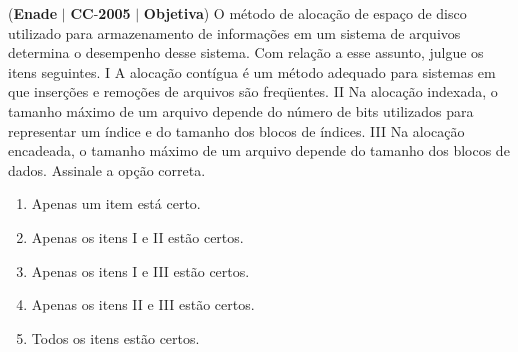 \documentclass{exam}
\begin{document}
\begin{questions}
\question (\textbf{Enade} $|$ \textbf{CC}-\textbf{2005} $|$ \textbf{Objetiva})
O método de alocação de espaço de disco utilizado para
armazenamento de informações em um sistema de arquivos
determina o desempenho desse sistema. Com relação a esse assunto,
julgue os itens seguintes.
I A alocação contígua é um método adequado para sistemas em
que inserções e remoções de arquivos são freqüentes.
II Na alocação indexada, o tamanho máximo de um arquivo
depende do número de bits utilizados para representar um índice
e do tamanho dos blocos de índices.
III Na alocação encadeada, o tamanho máximo de um arquivo
depende do tamanho dos blocos de dados.
Assinale a opção correta.
	\begin{enumerate}[label=\alph*)]
		\item  Apenas um item está certo.
		\item  Apenas os itens I e II estão certos.
		\item  Apenas os itens I e III estão certos.
		\item  Apenas os itens II e III estão certos.
		\item  Todos os itens estão certos.
	\end{enumerate}


\end{questions}
\end{document}

